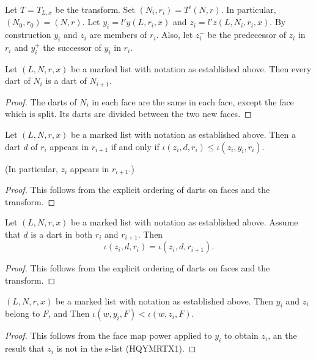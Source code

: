 Let $T = T_{L,x}$ be the transform.  Set $(N_i,r_i) = T^i (N,r)$.  In particular,
$(N_0,r_0) = (N,r)$.   Let $y_i = l'y(L,r_i,x)$ and $z_i = l'z (L,N_i,r_i,x)$.
By construction $y_i$ and $z_i$ are members of $r_i$.
Also, let $z_i^-$ be the predecessor of $z_i$ in $r_i$ and $y_i^+$ the successor of
$y_i$ in $r_i$.

\begin{lemma}  Let $(L,N,r,x)$ be a marked list with notation as established above.
Then every dart of $N_i$ is a dart of $N_{i+1}$.
\end{lemma}

\begin{proof} The darts of $N_i$ in each face are the same in each face, except the face which is split.
Its darts are divided between the two new faces.
\end{proof}

\begin{lemma} 
Let $(L,N,r,x)$ be a marked list with notation as established above.
Then a dart $d$ of $r_i$ appears in $r_{i+1}$ if and only if $\iota(z_i,d,r_i)\le \iota(z_i,y_i,r_i)$.
\end{lemma}

(In particular, $z_i$ appears in $r_{i+1}$.)

\begin{proof} This follows from the explicit ordering of darts on faces and the transform.
\end{proof}


\begin{lemma}
Let $(L,N,r,x)$ be a marked list with notation as established above.
Assume that $d$ is a dart in both $r_i$ and $r_{i+1}$.  Then 
\[
\iota(z_i,d,r_i) = \iota(z_i,d,r_{i+1}).
\]
\end{lemma}

\begin{proof} This follows from the explicit ordering of darts on faces and the transform.
\end{proof}

\begin{lemma}
$(L,N,r,x)$ be a marked list with notation as established above.
Then $y_i$ and $z_i$ belong to $F$, and
Then $\iota(w,y_i,F) < \iota(w,z_i,F)$.
\end{lemma}

\begin{proof} This follows from the face map power applied to $y_i$ to obtain $z_i$,
an the result that $z_i$ is not in the s-list (HQYMRTX1).
\end{proof}

